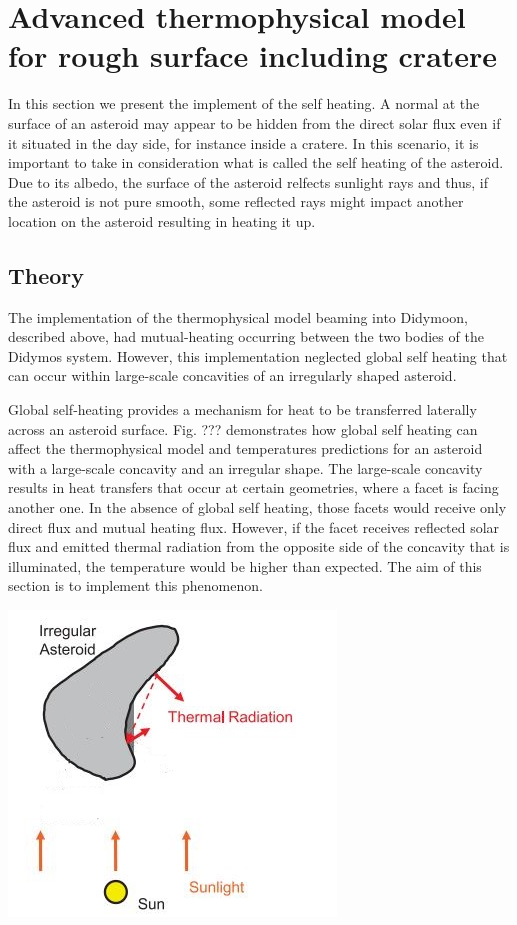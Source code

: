 \section{Advanced thermophysical model for rough surface including cratere}
\label{sec:5}

In this section we present the implement of the self heating. A normal at the surface of an asteroid may appear to be hidden from the direct solar flux even if it situated in the day side, for instance inside a cratere. In this scenario, it is important to take in consideration what is called the self heating of the asteroid. Due to its albedo, the surface of the asteroid relfects sunlight rays and thus, if the asteroid is not pure smooth, some reflected rays might impact another location on the asteroid resulting in heating it up.

\subsection{Theory}

The implementation of the thermophysical model beaming into Didymoon, described above, had mutual-heating occurring between the two bodies of the Didymos system. However, this implementation neglected global self heating that can occur within large-scale concavities of an irregularly shaped asteroid.

Global self-heating provides a mechanism for heat to be transferred laterally across an asteroid surface. Fig. ??? demonstrates how global self heating can affect the thermophysical model and temperatures predictions for an asteroid with a large-scale concavity and an irregular shape. The large-scale concavity results in heat transfers that occur at certain geometries, where a facet is facing another one. In the absence of global self heating, those facets would receive only direct flux and mutual heating flux. However, if the facet receives reflected solar flux and emitted thermal radiation from the opposite side of the concavity that is illuminated, the temperature would be higher than expected. The aim of this section is to implement this phenomenon.

\begin{center}
    \includegraphics[width=0.5\linewidth]{rsc/self.jpg}
    \label{fig:5.1}
\end{center}

